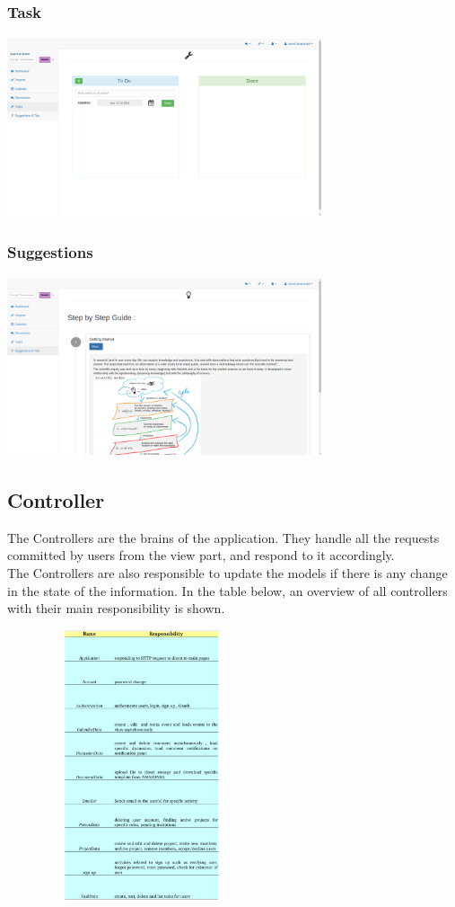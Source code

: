 \subsubsection{Task}

\begin{center}
\includegraphics[height=200px, width=350px]{./img/dsgn_img/task.png}
	
\end{center}

\subsubsection{Suggestions}

\begin{center}
\includegraphics[height=200px, width=350px]{./img/dsgn_img/suggestions.png}
	
\end{center}
\newpage
\subsection{Controller}
The Controllers are the brains of the application. They handle all the requests committed by users from the view part, and respond to it accordingly.\\
The Controllers are also responsible to update the models if there is any change in the state of the information. In the table below, an overview of all controllers with their main responsibility is shown.\\

\begin{center}
\includegraphics[height=300px, width=300px]{./img/dsgn_img/controllers.png}
	
\end{center}